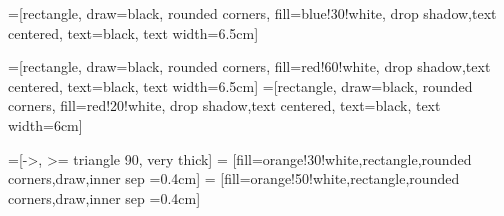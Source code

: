 
=[rectangle, draw=black, rounded corners, fill=blue!30!white, drop shadow,text centered, text=black, text width=6.5cm]

=[rectangle, draw=black, rounded corners, fill=red!60!white, drop shadow,text centered, text=black, text width=6.5cm]
=[rectangle, draw=black, rounded corners, fill=red!20!white, drop shadow,text centered, text=black, text width=6cm]

=[->, >= triangle 90, very thick]
 = [fill=orange!30!white,rectangle,rounded corners,draw,inner sep =0.4cm]
 = [fill=orange!50!white,rectangle,rounded corners,draw,inner sep =0.4cm]


